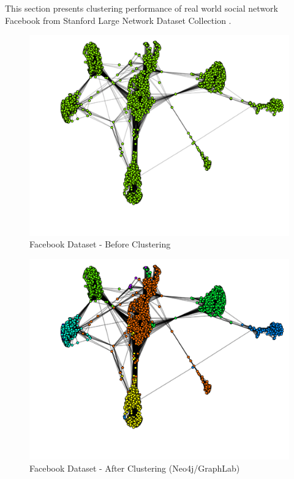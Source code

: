 This section presents clustering performance of real world social network Facebook \cite{facebookdata} from Stanford Large Network Dataset Collection \cite{snap}.\\
\begin{figure}[H]
	\centering
	\includegraphics[scale=0.4, trim=0 0 20 0]{Images/before_facebook.pdf}
	\caption{Facebook Dataset - Before Clustering\label{fig:fb-before}}
\end{figure}
\begin{figure}[H]
	\centering
	\includegraphics[scale=0.4, trim=0 0 20 0]{Images/after_facebook.pdf}
	\caption{Facebook Dataset - After Clustering (Neo4j/GraphLab)\label{fig:fb-after}}
\end{figure}

